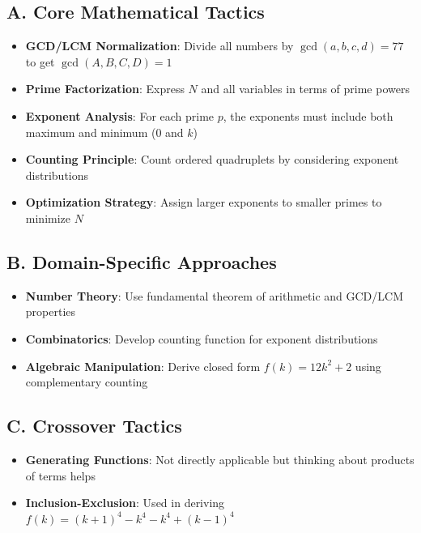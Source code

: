 \documentclass[11pt]{article}
\begin{document}
\begin{tacticalbox}
\subsection*{A. Core Mathematical Tactics}
\begin{itemize}[leftmargin=*]
    \item \textbf{GCD/LCM Normalization}: Divide all numbers by $\gcd(a,b,c,d) = 77$ to get $\gcd(A,B,C,D) = 1$
    \item \textbf{Prime Factorization}: Express $N$ and all variables in terms of prime powers
    \item \textbf{Exponent Analysis}: For each prime $p$, the exponents must include both maximum and minimum (0 and $k$)
    \item \textbf{Counting Principle}: Count ordered quadruplets by considering exponent distributions
    \item \textbf{Optimization Strategy}: Assign larger exponents to smaller primes to minimize $N$
\end{itemize}

\subsection*{B. Domain-Specific Approaches}
\begin{itemize}[leftmargin=*]
    \item \textbf{Number Theory}: Use fundamental theorem of arithmetic and GCD/LCM properties
    \item \textbf{Combinatorics}: Develop counting function for exponent distributions
    \item \textbf{Algebraic Manipulation}: Derive closed form $f(k) = 12k^2 + 2$ using complementary counting
\end{itemize}

\subsection*{C. Crossover Tactics}
\begin{itemize}[leftmargin=*]
    \item \textbf{Generating Functions}: Not directly applicable but thinking about products of terms helps
    \item \textbf{Inclusion-Exclusion}: Used in deriving $f(k) = (k+1)^4 - k^4 - k^4 + (k-1)^4$
\end{itemize}
\end{tacticalbox}
\end{document}
